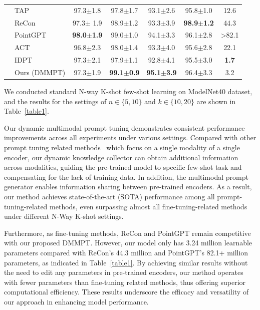 \documentclass{ecai}
\begin{document}
\begin{table}
\begin{center}
\begin{tabular}{llccccc}
&TAP~\cite{wang2023take}&97.3$\pm$1.8&97.8$\pm$1.7&93.1$\pm$2.6&95.8$\pm$1.0& 12.6\\
&ReCon~\cite{qi2023contrast}&97.3$\pm$ 1.9&98.9$\pm$1.2&93.3$\pm$3.9&\textbf{98.9$\pm$1.2}& 44.3\\
&PointGPT~\cite{chen2024pointgpt}&\textbf{98.0$\pm$1.9}&99.0$\pm$1.0&94.1$\pm$3.3&96.1$\pm$2.8&>82.1\\
\midrule
{} 
&ACT~\cite{dong2022autoencoders}&96.8$\pm$2.3&98.0$\pm$1.4&93.3$\pm$4.0&95.6$\pm$2.8&22.1\\
&IDPT~\cite{zha2023instance}&97.3$\pm$2.1&97.9$\pm$1.1&92.8$\pm$4.1&95.5$\pm$3.0&\textbf{1.7}\\
&Ours (DMMPT)&97.3$\pm$1.9&\textbf{99.1$\pm$0.9}&\textbf{95.1$\pm$3.9}&96.4$\pm$3.3&3.2\\
\bottomrule
\end{tabular}
\end{center}
\end{table}

We conducted standard N-way K-shot few-shot learning on ModelNet40  dataset, and the results for the settings of $n\in \{5,10\}$ and $k\in \{10,20\}$ are shown in Table~\ref{table1}.

Our dynamic multimodal prompt tuning demonstrates consistent performance improvements across all experiments under various settings. Compared with other prompt tuning related methods~\cite{dong2022autoencoders, zha2023instance} which focus on a single modality of a single encoder, our dynamic knowledge collector can obtain additional information across modalities, guiding the pre-trained model to specific few-shot task and compensating for the lack of training data. In addition, the multimodal prompt generator enables information sharing between pre-trained encoders. As a result, our method achieves state-of-the-art (SOTA) performance among all prompt-tuning-related methods, even surpassing almost all fine-tuning-related methods under different N-Way K-shot settings. 

Furthermore, as fine-tuning methods, ReCon and PointGPT remain competitive with our proposed DMMPT. However, our model only has 3.24 million learnable parameters compared with ReCon's 44.3 million and PointGPT's 82.1+ million parameters, as indicated in Table~\ref{table1}. By achieving similar results without the need to edit any parameters in pre-trained encoders, our method operates with fewer parameters than fine-tuning related methods, thus offering superior computational efficiency. These results underscore the efficacy and versatility of our approach in enhancing model performance.
\end{document}
